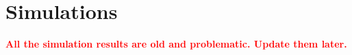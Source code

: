 \documentclass[]{article}
\begin{document}
%
%
%
%
%


\section{Simulations}\label{sim}

\textbf{\textcolor{red}{All the simulation results are old and problematic. Update them later.}}
\end{document}

